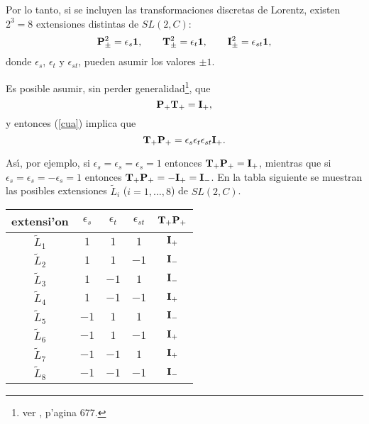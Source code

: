 Por lo tanto, si se incluyen las transformaciones discretas de Lorentz,
existen $2^3=8$ extensiones distintas de $SL(2,C)$: 
\begin{equation}
{\bf P}_{\pm }^2=\epsilon _{s}{\bf 1}, \qquad {\bf T}_{\pm
}^2=\epsilon _{t}{\bf 1}, \qquad {\bf I}_{\pm }^2=\epsilon _{st}%
{\bf 1},  \label{cua}
\end{equation}
donde $\epsilon _{s}$, $\epsilon _{t}$ y $\epsilon _{st}$, pueden asumir los
valores $\pm 1$.

Es posible asumir, sin perder generalidad\footnote{%
ver \cite{Cornwell}, p'agina 677.}, que 
\begin{equation}
{\bf P}_{+}{\bf T}_{+}={\bf I}_{+}, 
\end{equation}
y entonces (\ref{cua}) implica \cite{BS} que 
\begin{equation}
{\bf T}_{+}{\bf P}_{+}=\epsilon _{s}\epsilon _{t}\epsilon _{st}{\bf I}_{+}.
\label{reves}
\end{equation}

As{\'{\i }}, por ejemplo, si $\epsilon _{s}=\epsilon _{s}=\epsilon _{s}=1$
entonces ${\bf T}_{+}{\bf P}_{+}={\bf I}_{+}$, mientras que si $\epsilon
_{s}=\epsilon _{s}=-\epsilon _{s}=1$ entonces ${\bf T}_{+}{\bf P}_{+}=-{\bf I%
}_{+}={\bf I}_{-}$. En la tabla siguiente se muestran las posibles
extensiones $\widetilde{L}_{i}$ ($i=1,\ldots ,8$) de $SL(2,C)$.

\begin{center}
\begin{tabular}{c||c|c|c|c}
extensi'on & $\epsilon _{s}$ & $\epsilon _{t}$ & $\epsilon _{st}$ & ${\bf %
T}_{+}{\bf P}_{+}$ \\ \hline\hline
$\widetilde{L}_{1}$ & $1$ & $1$ & $1$ & ${\bf I}_{+}$ \\ \hline
$\widetilde{L}_{2}$ & $1$ & $1$ & $-1$ & ${\bf I}_{-}$ \\ \hline
$\widetilde{L}_{3}$ & $1$ & $-1$ & $1$ & ${\bf I}_{-}$ \\ \hline
$\widetilde{L}_{4}$ & $1$ & $-1$ & $-1$ & ${\bf I}_{+}$ \\ \hline
$\widetilde{L}_{5}$ & $-1$ & $1$ & $1$ & ${\bf I}_{-}$ \\ \hline
$\widetilde{L}_{6}$ & $-1$ & $1$ & $-1$ & ${\bf I}_{+}$ \\ \hline
$\widetilde{L}_{7}$ & $-1$ & $-1$ & $1$ & ${\bf I}_{+}$ \\ \hline
$\widetilde{L}_{8}$ & $-1$ & $-1$ & $-1$ & ${\bf I}_{-}$ \\ \hline
\end{tabular}
\end{center}


